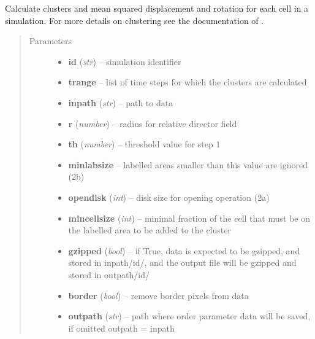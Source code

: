 \documentclass[letterpaper,10pt,english]{sphinxmanual}
\begin{document}
\begin{fulllineitems}
\label{CC3DPipeline:CC3DPipeline.getClustersForSim}
Calculate clusters and mean squared displacement and rotation for each cell in a simulation. For more details on clustering see the documentation of {\hyperref[AnalysisUtils:AnalysisUtils.getCellClusters]{}}.
\begin{quote}\begin{description}
\item[{Parameters}] \leavevmode\begin{itemize}
\item {} 
\textbf{id} (\emph{str}) -- simulation identifier

\item {} 
\textbf{trange} -- list of time steps for which the clusters are calculated

\item {} 
\textbf{inpath} (\emph{str}) -- path to data

\item {} 
\textbf{r} (\emph{number}) -- radius for relative director field

\item {} 
\textbf{th} (\emph{number}) -- threshold value for step 1

\item {} 
\textbf{minlabsize} -- labelled areas smaller than this value are ignored (2b)

\item {} 
\textbf{opendisk} (\emph{int}) -- disk size for opening operation (2a)

\item {} 
\textbf{mincellsize} (\emph{int}) -- minimal fraction of the cell that must be on the labelled area to be added to the  cluster

\item {} 
\textbf{gzipped} (\emph{bool}) -- if True, data is expected to be gzipped, and stored in inpath/id/, and the output file will be gzipped and stored in outpath/id/

\item {} 
\textbf{border} (\emph{bool}) -- remove border pixels from data

\item {} 
\textbf{outpath} (\emph{str}) -- path where order parameter data will be saved, if omitted outpath = inpath


\end{itemize}
\end{description}
\end{quote}
\end{fulllineitems}
\end{document}
